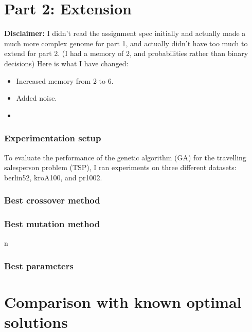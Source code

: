 \documentclass[11pt]{scrartcl} %
\begin{document}

\section{Part 2: Extension}

\textbf{Disclaimer:} 
I didn't read the assignment spec initially and actually made a much more complex genome for part 1, and actually didn't have too much to extend for part 2. (I had a memory of 2, and probabilities rather than binary decisions)
Here is what I have changed:
\begin{itemize}
	\item Increased memory from 2 to 6.
	\item Added noise.
	\item 
\end{itemize}

\subsubsection{Experimentation setup}
To evaluate the performance of the genetic algorithm (GA) for the travelling salesperson problem (TSP), I ran experiments on three different datasets: berlin52, kroA100, and pr1002.


\subsubsection{Best crossover method}

\subsubsection{Best mutation method}
n 
\subsubsection{Best parameters}

\section{Comparison with known optimal solutions}
\label{Comparison with known optimal solutions}
\end{document}
